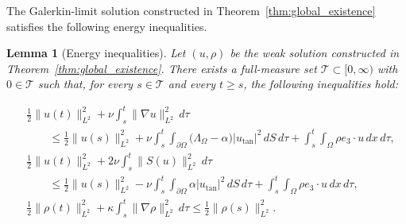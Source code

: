 \documentclass[11pt,reqno]{amsart}
\theoremstyle{plain}
\newtheorem{lemma}[thm]{Lemma}
\numberwithin{equation}{section}
\newcommand{\tanproj}{\text{tan}}
\begin{document}
The Galerkin-limit solution constructed in Theorem~\ref{thm:global_existence} satisfies the following energy inequalities.

\begin{lemma}[Energy inequalities]\label{lem:energy_inequalities}
Let $(u,\rho)$ be the weak solution constructed in Theorem~\ref{thm:global_existence}. There exists a full-measure set $\mathcal T\subset[0,\infty)$ with $0\in\mathcal T$ such that, for every $s\in\mathcal T$ and every $t\ge s$, the following inequalities hold:

\begin{align}
&\frac{1}{2}\|u(t)\|_{L^2}^2
  + \nu \int_s^t \|\nabla u\|_{L^2}^2\,d\tau
\nonumber \\
&\qquad \leq
  \frac{1}{2}\|u(s)\|_{L^2}^2
  +\nu\int_s^t \int_{\partial\Omega}
  \bigl(\Lambda_\Omega-\alpha\bigr)
  |u_{\tanproj}|^2\,dS\,d\tau
  +\int_s^t\int_\Omega \rho e_3\cdot u\,dx\,d\tau,\label{eq:energy_ineq1}
\\[0.5em]
&\frac{1}{2}\|u(t)\|_{L^2}^2
  +2\nu\int_s^t\|S(u)\|_{L^2}^2\,d\tau
\nonumber \\
&\qquad \leq
  \frac{1}{2}\|u(s)\|_{L^2}^2
  -\nu\int_s^t\int_{\partial\Omega}
  \alpha|u_{\tanproj}|^2 \, dS \, d\tau
  +\int_s^t\int_\Omega \rho e_3\cdot u\,dx\,d\tau,\label{eq:energy_ineq2}
\\[0.5em]
&\frac{1}{2}\|\rho(t)\|_{L^2}^2
  +\kappa\int_s^t\|\nabla\rho\|_{L^2}^2\,d\tau\leq\frac{1}{2}\|\rho(s)\|_{L^2}^2.\label{eq:rho_energy_ineq}
\end{align}
\end{lemma}
\end{document}
